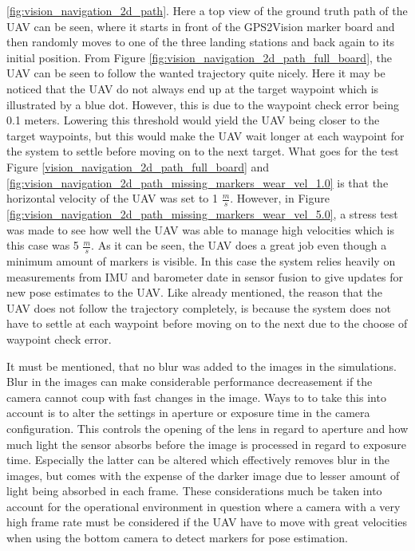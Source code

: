 \documentclass[../Head/report.tex]{subfiles}
\begin{document}
\ref{fig:vision_navigation_2d_path}. Here a top view of the ground truth path of the UAV can be seen, where it starts in front of the GPS2Vision marker board and then randomly moves to one of the three landing stations and back again to its initial position. From Figure \ref{fig:vision_navigation_2d_path_full_board}, the UAV can be seen to follow the wanted trajectory quite nicely. Here it may be noticed that the UAV do not always end up at the target waypoint which is illustrated by a blue dot. However, this is due to the waypoint check error being 0.1 meters. Lowering this threshold would yield the UAV being closer to the target waypoints, but this would make the UAV wait longer at each waypoint for the system to settle before moving on to the next target. What goes for the test Figure \ref{vision_navigation_2d_path_full_board} and \ref{fig:vision_navigation_2d_path_missing_markers_wear_vel_1.0} is that the horizontal velocity of the UAV was set to 1 $\frac{m}{s}$. However, in Figure \ref{fig:vision_navigation_2d_path_missing_markers_wear_vel_5.0}, a stress test was made to see how well the UAV was able to manage high velocities which is this case was 5 $\frac{m}{s}$. As it can be seen, the UAV does a great job even though a minimum amount of markers is visible. In this case the system relies heavily on measurements from IMU and barometer date in sensor fusion to give updates for new pose estimates to the UAV. Like already mentioned, the reason that the UAV does not follow the trajectory completely, is because the system does not have to settle at each waypoint before moving on to the next due to the choose of waypoint check error. 

It must be mentioned, that no blur was added to the images in the simulations. Blur in the images can make considerable performance decreasement if the camera cannot coup with fast changes in the image. Ways to to take this into account is to alter the settings in aperture or exposure time in the camera configuration. This controls the opening of the lens in regard to aperture and how much light the sensor absorbs before the image is processed in regard to exposure time. Especially the latter can be altered which effectively removes blur in the images, but comes with the expense of the darker image due to lesser amount of light being absorbed in each frame. These considerations much be taken into account for the operational environment in question where a camera with a very high frame rate must be considered if the UAV have to move with great velocities when using the bottom camera to detect markers for pose estimation. 
\end{document}
